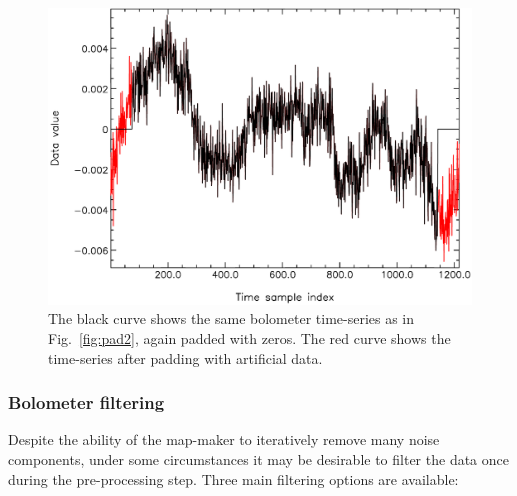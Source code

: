 \documentclass[useAMS,usenatbib,nofootinbib]{mn2e}
\begin{document}
\begin{enumerate}
\begin{figure}
\centering
\includegraphics[width=\linewidth]{pad1}
\caption{The black curve shows the same bolometer time-series as in
Fig.~\ref{fig:pad2}, again padded with zeros. The red curve shows the
time-series after padding with artificial data.}
\label{fig:pad1}
\end{figure}

\end{enumerate}

\subsubsection{Bolometer filtering}

Despite the ability of the map-maker to iteratively remove many noise
components, under some circumstances it may be desirable to filter the
data once during the pre-processing step. Three main filtering options
are available:
\end{document}
